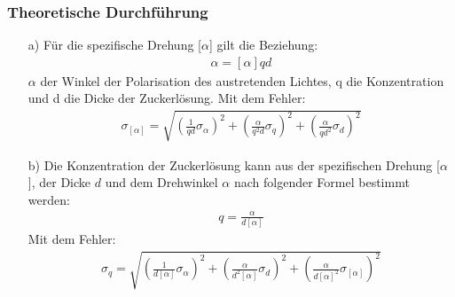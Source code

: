 \documentclass[12pt]{scrartcl}
\begin{document}
\subsubsection{Theoretische Durchführung}
\begin{enumerate}
\item[a)] Für die spezifische Drehung [$\alpha$] gilt die Beziehung:
\begin{align}
\alpha = [\alpha] q d
\end{align}
$\alpha$ der Winkel der Polarisation des austretenden Lichtes, q die Konzentration und d die Dicke der Zuckerlösung.
Mit dem Fehler:
\begin{align}
\sigma_{[\alpha]} = \sqrt{
\left(\frac{1}{q d}\sigma_{\alpha}\right)^2+
\left(\frac{\alpha}{q^2 d}\sigma_q\right)^2+
\left(\frac{\alpha}{q d^2}\sigma_d\right)^2}
\end{align}
\item[b)]
Die Konzentration der Zuckerlösung kann aus der spezifischen Drehung [$\alpha$], der Dicke $d$ und dem Drehwinkel $\alpha$ nach folgender Formel bestimmt werden:
\begin{align}
q = \frac{\alpha}{d [\alpha]}
\end{align}
Mit dem Fehler:
\begin{align}
\sigma_q = \sqrt{
\left(\frac{1}{d [\alpha]}\sigma_\alpha \right)^2+
\left(\frac{\alpha}{d^2 [\alpha]}\sigma_d \right)^2+
\left(\frac{\alpha}{d [\alpha]^2}\sigma_{[\alpha]}\right)^2}
\end{align}
\end{enumerate}
\end{document}
